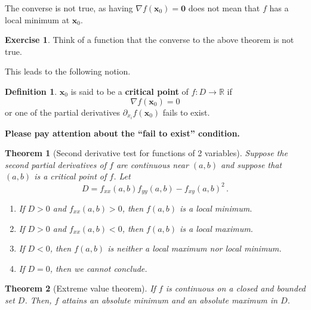 \documentclass[
]{article}
\newtheorem{theorem}{Theorem}[section]
\theoremstyle{definition}
\newtheorem{definition}{Definition}[section]
\theoremstyle{definition}
\theoremstyle{definition}
\newtheorem{exercise}{Exercise}[section]
\theoremstyle{definition}
\theoremstyle{remark}
\begin{document}
The converse is not true, as having \(\nabla f(\mathbf{x}_0) = \mathbf{0}\) does not mean
that \(f\) has a local minimum at \(\mathbf{x}_0\).

\begin{exercise}
Think of a function that the converse to the above theorem is not true.
\end{exercise}

This leads to the following notion.

\begin{definition}
\(\mathbf{x}_0\) is said to be a \textbf{critical point} of \(f:D\to \mathbb{R}\) if
\begin{equation*}
    \nabla f(\mathbf{x}_0) = 0
\end{equation*}
or one of the partial derivatives \(\partial_{x_i} f(\mathbf{x}_0)\) fails to exist.
\end{definition}

\textbf{Please pay attention about the ``fail to exist'' condition.}

\begin{theorem}[Second derivative test for functions of 2 variables]

Suppose the second partial derivatives of \(f\) are continuous near \((a,b)\)
and suppose that \((a,b)\) is a critical point of \(f\).
Let
\begin{equation*}
    D = f_{xx}(a,b) f_{yy}(a,b) - f_{xy}(a,b)^2\,.
\end{equation*}

\begin{enumerate}
\def\labelenumi{\arabic{enumi}.}
\item
  If \(D>0\) and \(f_{xx}(a,b) >0\), then \(f(a,b)\) is a local minimum.
\item
  If \(D>0\) and \(f_{xx}(a,b) <0\), then \(f(a,b)\) is a local maximum.
\item
  If \(D<0\), then \(f(a,b)\) is neither a local maximum nor local minimum.
\item
  If \(D=0\), then we cannot conclude.
\end{enumerate}

\end{theorem}

\begin{theorem}[Extreme value theorem]
If \(f\) is continuous on a \emph{closed} and \emph{bounded} set \(D\). Then,
\(f\) attains an absolute minimum and an absolute maximum in \(D\).
\end{theorem}
\end{document}
